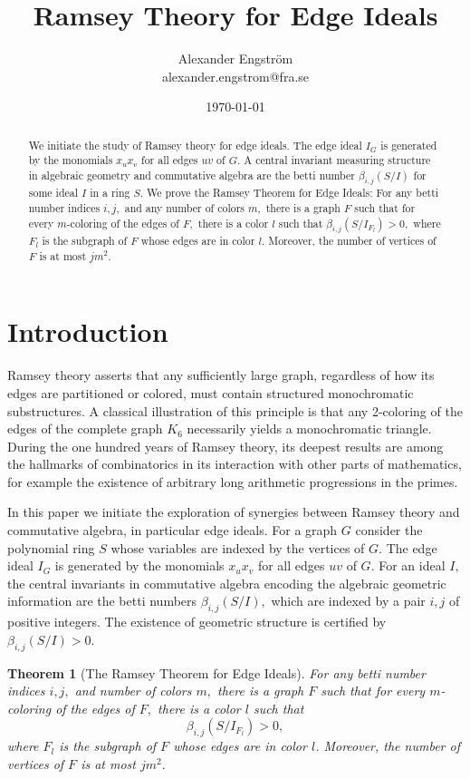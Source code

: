 \documentclass{article}
\title{Ramsey Theory for Edge Ideals}
\author{ Alexander Engström\\ alexander.engstrom@fra.se }
\date\today
\theoremstyle{plain}
\newtheorem*{mainthm}{Theorem}
\theoremstyle{definition}
\begin{document}
\maketitle

\begin{abstract}
We initiate the study of Ramsey theory for edge ideals. The edge ideal $I_G$ is generated by the monomials $x_ux_v$ for all edges $uv$ of $G.$ A central invariant measuring structure in algebraic geometry and commutative algebra are the betti number $\beta_{i,j}(S/I)$ for some ideal $I$ in a ring $S.$ We prove the Ramsey Theorem for Edge Ideals: For any betti number indices $i,j,$ and any number of colors $m,$ there is a graph $F$ such that for every $m$-coloring of the edges of $F,$ there is a color $l$ such that $ \beta_{i,j}(S/I_{F_l}) >0, $ where $F_l$ is the subgraph of $F$ whose edges are in color $l$. Moreover, the number of vertices of $F$ is at most $jm^2.$
\end{abstract}

\section{Introduction}

Ramsey theory asserts that any sufficiently large graph, regardless of how its edges are partitioned or colored, must contain structured monochromatic substructures. A classical illustration of this principle is that any 2-coloring of the edges of the complete graph $K_6$ necessarily yields a monochromatic triangle. During the one hundred years of Ramsey theory, its deepest results are among the hallmarks of combinatorics in its interaction with other parts of mathematics, for example the existence of arbitrary long arithmetic progressions in the primes.

In this paper we initiate the exploration of synergies between Ramsey theory and commutative algebra, in particular edge ideals. For a graph $G$ consider the polynomial ring $S$ whose variables are indexed by the vertices of $G.$ The edge ideal $I_G$ is generated by the monomials $x_ux_v$ for all edges $uv$ of $G.$ For an ideal $I,$ the central invariants in commutative algebra encoding the algebraic geometric information are the betti numbers $\beta_{i,j}(S/I),$ which are indexed by a pair $i,j$ of positive integers. The existence of geometric structure is certified by $\beta_{i,j}(S/I)>0.$

\begin{mainthm}[The Ramsey Theorem for Edge Ideals]
For any betti number indices $i,j,$ and number of colors $m,$ there is a graph $F$ such that for every $m$-coloring of the edges of $F,$ there is a color $l$ such that
\[ \beta_{i,j}(S/I_{F_l}) >0, \]
where $F_l$ is the subgraph of $F$ whose edges are in color $l$. Moreover, the number of vertices of $F$ is at most $jm^2.$
\end{mainthm}
\end{document}
